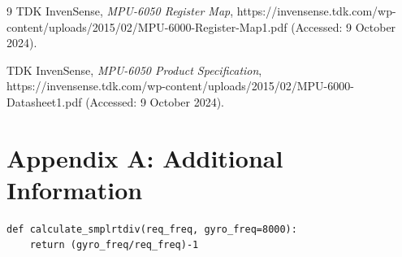 \documentclass{article}
\begin{document}

\begin{thebibliography}{9}
	TDK InvenSense,
	\textit{MPU-6050 Register Map}, {https://invensense.tdk.com/wp-content/uploads/2015/02/MPU-6000-Register-Map1.pdf} (Accessed: 9 October 2024).
	
	TDK InvenSense,
	\textit{MPU-6050 Product Specification}, {https://invensense.tdk.com/wp-content/uploads/2015/02/MPU-6000-Datasheet1.pdf} (Accessed: 9 October 2024).
	
\end{thebibliography}


\appendix

\section{Appendix A: Additional Information}

\begin{lstlisting}
def calculate_smplrtdiv(req_freq, gyro_freq=8000):
	return (gyro_freq/req_freq)-1
\end{lstlisting}


	
	
\end{document}
